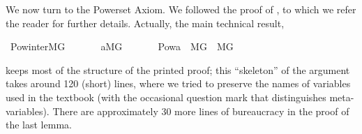We now turn to the Powerset Axiom. We followed the proof of
\cite[IV.2.27]{kunen2011set}, to which we refer the reader for further
details. Actually, the main technical result,
\begin{isabelle}
\isamarkupfalse%
\ Pow{\isacharunderscore}inter{\isacharunderscore}MG{\isacharcolon}\isanewline
\ \ \isanewline
\ \ \ \ {\isachardoublequoteopen}a{\isasymin}M{\isacharbrackleft}G{\isacharbrackright}{\isachardoublequoteclose}\isanewline
\ \ \isanewline
\ \ \ \ {\isachardoublequoteopen}Pow{\isacharparenleft}a{\isacharparenright}\ {\isasyminter}\ M{\isacharbrackleft}G{\isacharbrackright}\ {\isasymin}\ M{\isacharbrackleft}G{\isacharbrackright}{\isachardoublequoteclose}
\end{isabelle}
keeps most of the structure of the printed proof; this ``skeleton'' of the
argument takes around 120 (short) lines, where we tried to  preserve the
names of variables used in the textbook (with the occasional question
mark that distinguishes meta-variables). There are approximately 30
more lines of bureaucracy in the proof of the last lemma. 

